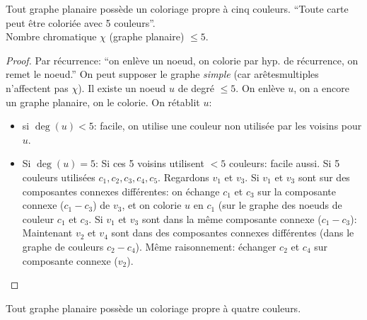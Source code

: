 \begin{mytheo} [Kempe]
  Tout graphe planaire possède un coloriage propre à cinq couleurs.
  ``Toute carte peut être coloriée avec 5 couleurs''.\\
  Nombre chromatique $\chi$ (graphe planaire) $\leq 5$.
  \begin{proof}
    Par récurrence: ``on enlève un noeud, on colorie par hyp. de récurrence, on remet le noeud.''
    On peut supposer le graphe \emph{simple} (car arêtesmultiples n'affectent pas $\chi$).
    Il existe un noeud $u$ de degré $\leq 5$.
    On enlève $u$, on a encore un graphe planaire, on le colorie.
    On rétablit $u$:
    \begin{itemize}
      \item si $\deg(u) < 5$: facile, on utilise une couleur non utilisée par les voisins pour $u$.
      \item Si $\deg(u) = 5$: Si ces 5 voisins utilisent $< 5$ couleurs: facile aussi.
        Si 5 couleurs utilisées $c_1, c_2, c_3, c_4, c_5$.
        Regardons $v_1$ et $v_3$. Si $v_1$ et $v_3$ sont sur des composantes connexes différentes: on échange $c_1$ et $c_3$ sur
        la composante connexe ($c_1-c_3$) de $v_3$, et on colorie $u$ en $c_1$ (sur le graphe des noeuds de couleur $c_1$ et $c_3$.
        Si $v_1$ et $v_3$ sont dans la même composante connexe ($c_1-c_3$):
        Maintenant $v_2$ et $v_4$ sont dans des composantes connexes
        différentes (dans le graphe de couleurs $c_2-c_4$).
        Même raisonnement: échanger $c_2$ et $c_4$ sur composante connexe ($v_2$).
    \end{itemize}
  \end{proof}
\end{mytheo}

\begin{mytheo} 
  Tout graphe planaire possède un coloriage propre à quatre couleurs.
\end{mytheo}
